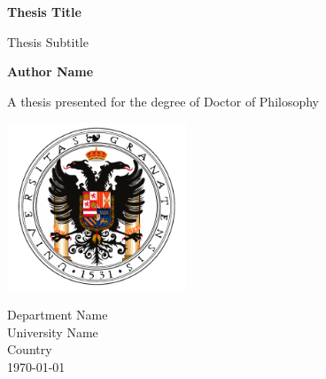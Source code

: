 \begin{titlepage}
    \begin{center}

        \Huge\textbf{Thesis Title}

        \vspace{0.4cm}

        \LARGE Thesis Subtitle

        \vspace{1.0cm}

        \textbf{Author Name}

        \vfill

        A thesis presented for the degree of Doctor of Philosophy

        \vspace{0.8cm}

        \includegraphics[width=0.4\textwidth]{images/university_logo.png}

        \Large
        Department Name\\
        University Name\\
        Country\\
        \today

    \end{center}
\end{titlepage}
